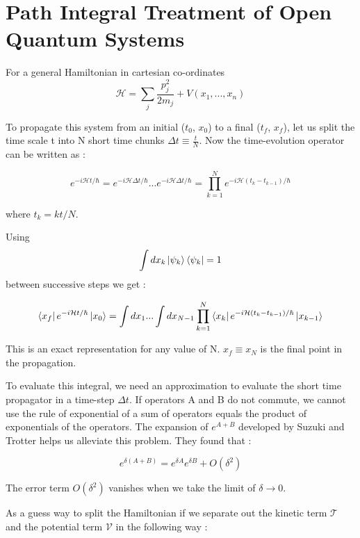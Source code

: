 \section{Path Integral Treatment of Open Quantum Systems}



For a general Hamiltonian in cartesian co-ordinates $$\mathcal{H} = \sum_{j} \frac{p_j^2}{2m_j} + V(x_1, ..., x_n)$$

To propagate this system from an initial ($t_0$, $x_0$) to a final ($t_f$, $x_f$), let us split the time scale t into N short time chunks $\Delta t \equiv \frac{t}{N}$. Now the time-evolution operator can be written as :

\begin{equation} \label{4.x}
    e^{-i\mathcal{H}t/\hbar} = e^{-i\mathcal{H}\Delta t/\hbar}...e^{-i\mathcal{H}\Delta t/\hbar} = \prod_{k=1}^{N} e^{-i\mathcal{H}(t_k - t_{k-1})/\hbar}
\end{equation}

where $t_k = kt/N$. 

Using $$\int dx_k \ket{\psi_k}\bra{\psi_k} = 1$$ between successive steps we get :

\begin{equation} \label{4.xx}
    \bra{x_f} e^{-i\mathcal{H}t/\hbar} \ket{x_0} = \int dx_1 ... \int dx_{N-1} \prod_{k=1}^{N} \bra{x_k} e^{-i\mathcal{H}(t_k - t_{k-1})/\hbar} \ket{x_{k-1}}
\end{equation}

This is an exact representation for any value of N. $x_f \equiv x_N$ is the final point in the  propagation.

To evaluate this integral, we need an approximation to evaluate the short time propagator in a time-step $\Delta t$. If operators A and B do not commute, we cannot use the rule of exponential of a sum of operators equals the product of exponentials of the operators. The expansion of $e^{A+B}$ developed by Suzuki and Trotter \cite{trotter1959} helps us alleviate this problem. They found that :

\begin{equation}\label{4.x}
e^{\delta(A + B)} = e^{\delta A}e^{\delta B} + O(\delta^2)
\end{equation}

The error term $O(\delta^2)$ vanishes when we take the limit of $\delta \to 0$.

As a guess way to split the Hamiltonian if we separate out the kinetic term $\mathcal{T}$ and the potential term $\mathcal{V}$ in the following way :


